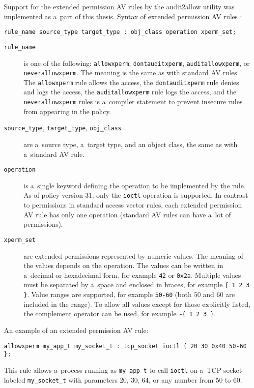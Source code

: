 Support for the extended permission AV rules by the audit2allow utility was
implemented as a~part of this thesis. Syntax of extended permission AV rules
\cite{xpermrules}:
\begin{lstlisting}[language=te]
rule_name source_type target_type : obj_class operation xperm_set;
\end{lstlisting}
\begin{description}
    \item [\texttt{rule\_name}] is one of the following: \texttt{allowxperm},
        \texttt{dontauditxperm}, \texttt{auditallowxperm}, or
        \texttt{neverallowxperm}. The meaning is the same as with standard AV
        rules. The \texttt{allowxperm} rule allows the access, the
        \texttt{dontauditxperm} rule denies and logs the access, the
        \texttt{auditallowxperm} rule logs the access, and the
        \texttt{neverallowxperm} rules is a~compiler statement to prevent
        insecure rules from appearing in the policy.
    \item [\texttt{source\_type}, \texttt{target\_type}, \texttt{obj\_class}]
        are a~source type, a~target type, and an object class, the same as with
        a~standard AV rule.
    \item [\texttt{operation}] is a~single keyword defining the operation to be
        implemented by the rule. As of policy version 31, only the
        \texttt{ioctl} operation is supported. In contrast to permissions in
        standard access vector rules, each extended permission AV rule has only
        one operation (standard AV rules can have a~lot of permissions).
    \item [\texttt{xperm\_set}] are extended permissions represented by numeric
        values. The meaning of the values depends on the operation. The values
        can be written in a~decimal or hexadecimal form, for example \texttt{42}
        or \texttt{0x2a}. Multiple values must be separated by a~space and
        enclosed in braces, for example \texttt{\{ 1 2 3 \}}. Value ranges are
        supported, for example \texttt{50-60} (both 50 and 60 are included in
        the range).  To allow all values except for those explicitly listed, the
        complement operator can be used, for example
        \texttt{\textasciitilde \{ 1 2 3 \}}.
\end{description}

An example of an extended permission AV rule:
\begin{lstlisting}[language=te]
allowxperm my_app_t my_socket_t : tcp_socket ioctl { 20 30 0x40 50-60 };
\end{lstlisting}
This rule allows a~process running as \texttt{my\_app\_t} to call \texttt{ioctl}
on a~TCP socket labeled \texttt{my\_socket\_t} with parameters 20, 30, 64, or
any number from 50 to 60.

